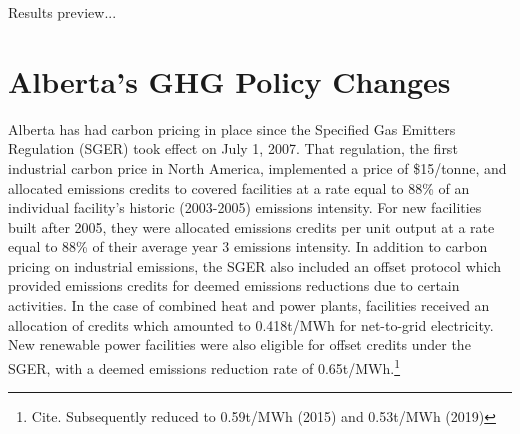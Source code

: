 \documentclass[12pt]{article}
\begin{document}
Results preview...


\section{Alberta's GHG Policy Changes}

Alberta has had carbon pricing in place since the Specified Gas Emitters Regulation (SGER) took effect on July 1, 2007. That regulation, the first industrial carbon price in North America, implemented a price of \$15/tonne, and allocated emissions credits to covered facilities at a rate equal to 88\% of an individual facility's historic (2003-2005) emissions intensity. For new facilities built after 2005, they were allocated emissions credits per unit output at a rate equal to 88\% of their average year 3 emissions intensity. In addition to carbon pricing on industrial emissions, the SGER also included an offset protocol which provided emissions credits for deemed emissions reductions due to certain activities. In the case of combined heat and power plants, facilities received an allocation of credits which amounted to 0.418t/MWh for net-to-grid electricity. New renewable power facilities were also eligible for offset credits under the SGER, with a deemed emissions reduction rate of 0.65t/MWh.\footnote{Cite. Subsequently reduced to 0.59t/MWh (2015) and 0.53t/MWh (2019)}
\end{document}
